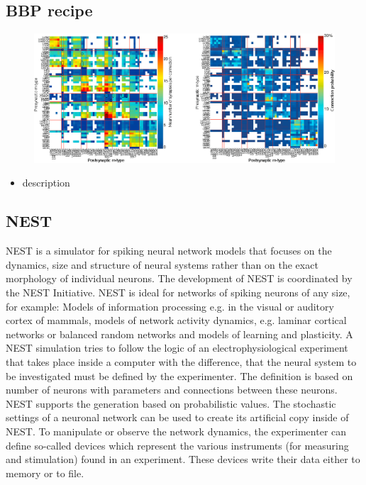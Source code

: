 \documentclass[a4paper]{article}
\begin{document}
\subsection{BBP recipe}
\begin{figure}[ht!]
\centering
\includegraphics[scale=0.9]{BBPconnectionPropasMatrix.eps}
\end{figure}

\begin{itemize}
      \item description
\end{itemize}

\subsection{NEST}
NEST is a simulator for spiking neural network models that focuses on the dynamics, size and structure of neural systems rather than on the exact morphology of individual neurons. The development of NEST is coordinated by the NEST Initiative. NEST is ideal for networks of spiking neurons of any size, for example:
Models of information processing e.g. in the visual or auditory cortex of mammals, models of network activity dynamics, e.g. laminar cortical networks or balanced random networks and models of learning and plasticity. A NEST simulation tries to follow the logic of an electrophysiological experiment that takes place inside a computer with the difference, that the neural system to be investigated must be defined by the experimenter. The definition is based on number of neurons with parameters and connections between these neurons. NEST supports the generation based on probabilistic values. The stochastic settings of a neuronal network can be used to create its artificial copy inside of NEST. To manipulate or observe the network dynamics, the experimenter can define so-called devices which represent the various instruments (for measuring and stimulation) found in an experiment. These devices write their data either to memory or to file. 
\end{document}
